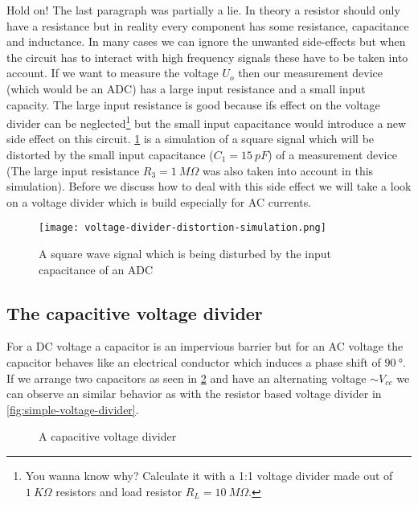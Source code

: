 Hold on! The last paragraph was partially a lie. In theory a resistor should only have a resistance but in reality every component has some resistance, capacitance and inductance. In many cases we can ignore the unwanted side-effects but when the circuit has to interact with high frequency signals these have to be taken into account. If we want to measure the voltage $U_o$ then our measurement device (which would be an ADC) has a large input resistance and a small input capacity. The large input resistance is good because ifs effect on the voltage divider can be neglected\footnote{You wanna know why? Calculate it with a 1:1 voltage divider made out of $\SI{1}{K\Omega}$ resistors and load resistor $R_L = \SI{10}{M\Omega}$.} but the small input capacitance would introduce a new side effect on this circuit. \cref{fig:voltage-divider-distortion} is a simulation of a square signal which will be distorted by the small input capacitance ($C_1 = \SI{15}{pF}$) of a measurement device (The large input resistance $R_3 = \SI{1}{M\Omega}$ was also taken into account in this simulation). Before we discuss how to deal with this side effect we will take a look on a voltage divider which is build especially for AC currents.

\begin{figure}[htb]
		\centering
		\texttt{[image: voltage-divider-distortion-simulation.png]}
		\caption{A square wave signal which is being disturbed by the input capacitance of an ADC}
		\label{fig:voltage-divider-distortion}
\end{figure}


\subsection{The capacitive voltage divider}

For a DC voltage a capacitor is an impervious barrier but for an AC voltage the capacitor behaves like an electrical conductor which induces a phase shift of $\SI{90}{\degree}$. If we arrange two capacitors as seen in \cref{fig:capacitive-voltage-divider} and have an alternating voltage $\sim V_{cc}$ we can observe an similar behavior as with the resistor based voltage divider in \cref{fig:simple-voltage-divider}.


\begin{figure}[htb]
	\centering
	\caption{A capacitive voltage divider}
	\label{fig:capacitive-voltage-divider}
\end{figure}


